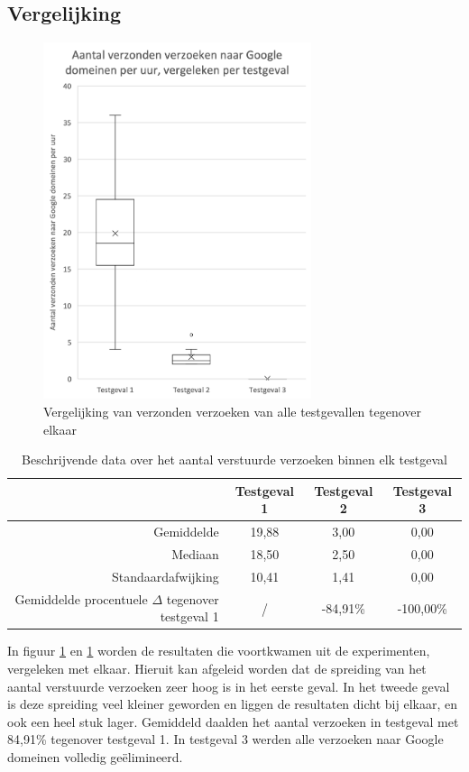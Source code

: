 \subsection{Vergelijking}

\begin{figure}
    \centering
    \includegraphics[width=0.7\textwidth]{experiment/grafieken/boxplot-compare.png}
    \caption{Vergelijking van verzonden verzoeken van alle testgevallen tegenover elkaar}
    \label{fig:boxplot-compare}
\end{figure}


\begin{table}[]
    \centering
    \begin{tabular}{@{}rccc@{}}
        \toprule
        & Testgeval 1 & Testgeval 2 & Testgeval 3 \\ \midrule
        Gemiddelde & 19,88 & 3,00 & 0,00 \\
        Mediaan & 18,50 & 2,50 & 0,00 \\
        Standaardafwijking & 10,41 & 1,41 & 0,00 \\
        Gemiddelde procentuele $\Delta$ tegenover testgeval 1 & / & -84,91\% & -100,00\% \\ \bottomrule
    \end{tabular}
    \caption{Beschrijvende data over het aantal verstuurde verzoeken binnen elk testgeval}
    \label{tab:misc-data}
\end{table}

In figuur \ref{fig:boxplot-compare} en \ref{tab:misc-data} worden de resultaten die voortkwamen uit de experimenten, vergeleken met elkaar. Hieruit kan afgeleid worden dat de spreiding van het aantal verstuurde verzoeken zeer hoog is in het eerste geval. In het tweede geval is deze spreiding veel kleiner geworden en liggen de resultaten dicht bij elkaar, en ook een heel stuk lager. Gemiddeld daalden het aantal verzoeken in testgeval met 84,91\% tegenover testgeval 1. In testgeval 3 werden alle verzoeken naar Google domeinen volledig geëlimineerd.
